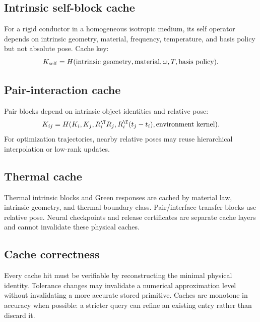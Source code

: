 \subsection{Intrinsic self-block cache}

For a rigid conductor in a homogeneous isotropic medium, its self operator
depends on intrinsic geometry, material, frequency, temperature, and basis
policy but not absolute pose. Cache key:
\[
 K_{\rm self}
 =
 H(\text{intrinsic geometry},\text{material},\omega,T,\text{basis policy}).
\]

\subsection{Pair-interaction cache}

Pair blocks depend on intrinsic object identities and relative pose:
\[
 K_{ij}
 =
 H(K_i,K_j,R_i^\T R_j,R_i^\T(t_j-t_i),
   \text{environment kernel}).
\]
For optimization trajectories, nearby relative poses may reuse hierarchical
interpolation or low-rank updates.

\subsection{Thermal cache}

Thermal intrinsic blocks and Green responses are cached by material law,
intrinsic geometry, and thermal boundary class. Pair/interface transfer blocks
use relative pose. Neural checkpoints and release certificates are separate
cache layers and cannot invalidate these physical caches.

\subsection{Cache correctness}

Every cache hit must be verifiable by reconstructing the minimal physical
identity. Tolerance changes may invalidate a numerical approximation level
without invalidating a more accurate stored primitive. Caches are monotone in
accuracy when possible: a stricter query can refine an existing entry rather
than discard it.
